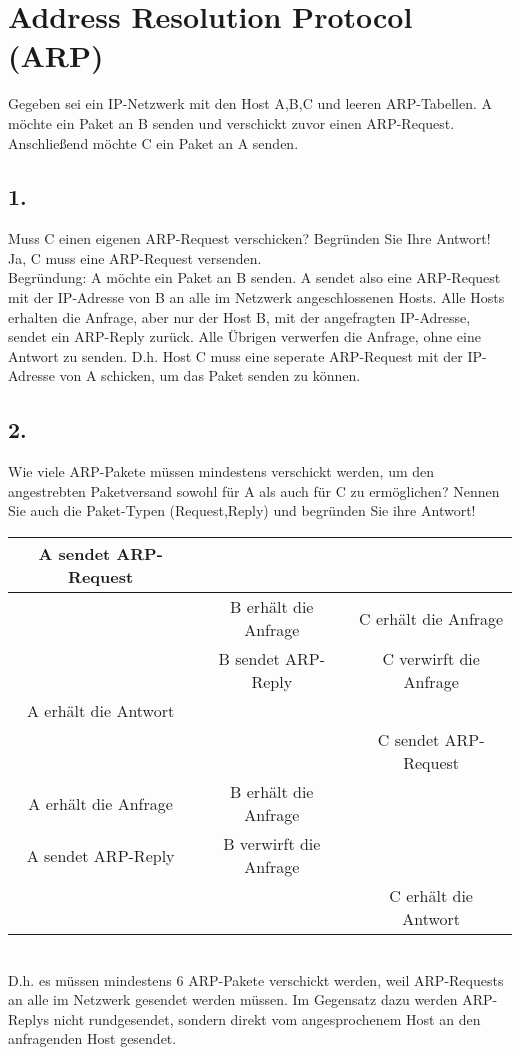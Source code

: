 \documentclass[paper=a4, fontsize=11pt]{scrartcl}
\numberwithin{equation}{section}
\numberwithin{figure}{section}
\numberwithin{table}{section}
\begin{document}
\section{Address Resolution Protocol (ARP)}
Gegeben sei ein IP-Netzwerk mit den Host A,B,C und leeren ARP-Tabellen. A möchte ein Paket an B senden und verschickt zuvor einen ARP-Request. Anschließend möchte C ein Paket an A senden.

\subsection{1.}
Muss C einen eigenen ARP-Request verschicken? Begründen Sie Ihre Antwort! \\

Ja, C muss eine ARP-Request versenden. \\

Begründung:
A möchte ein Paket an B senden. A sendet also eine ARP-Request mit der IP-Adresse von B an alle im Netzwerk angeschlossenen Hosts. Alle Hosts erhalten die Anfrage, aber nur der Host B, mit der angefragten IP-Adresse, sendet ein ARP-Reply zurück. Alle Übrigen verwerfen die Anfrage, ohne eine Antwort zu senden. D.h. Host C muss eine seperate ARP-Request mit der IP-Adresse von A schicken, um das Paket senden zu können.

\subsection{2.}
Wie viele ARP-Pakete müssen mindestens verschickt werden, um den angestrebten Paketversand sowohl für A als auch für C zu ermöglichen? Nennen Sie auch die Paket-Typen (Request,Reply) und begründen Sie ihre Antwort! \\ 

\begin{tabular}{|c|c|c|}
\hline
A sendet ARP-Request &                        & \\\hline
                     & B erhält die Anfrage   & C erhält die Anfrage \\\hline
                     & B sendet ARP-Reply     & C verwirft die Anfrage \\\hline
A erhält die Antwort &                        & \\\hline
                     &                        & C sendet ARP-Request \\\hline
A erhält die Anfrage & B erhält die Anfrage   & \\\hline
A sendet ARP-Reply   & B verwirft die Anfrage & \\\hline
                     &                        & C erhält die Antwort  \\\hline
\end{tabular} \\


D.h. es müssen mindestens 6 ARP-Pakete verschickt werden, weil ARP-Requests an alle im Netzwerk gesendet werden müssen. Im Gegensatz dazu werden ARP-Replys nicht rundgesendet, sondern direkt vom angesprochenem Host an den anfragenden Host gesendet.

\end{document}
